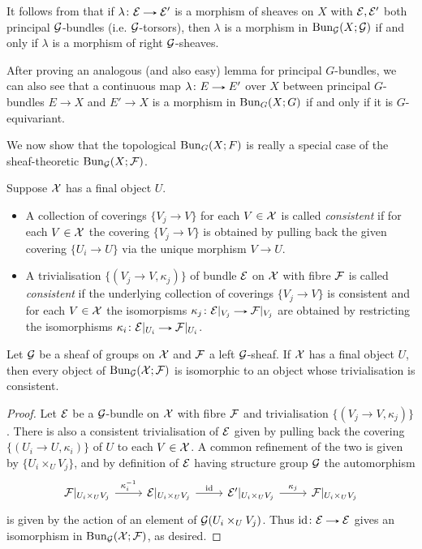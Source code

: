 \begin{remark}
  It follows from  that if $\lambda \c \E \to \E'$ is
  a morphism of sheaves on $X$ with $\mathcal{E},\mathcal{E}'$ both principal
  $\mathcal{G}$-bundles (i.e. $\mathcal{G}$-torsors), then $\lambda$ is a morphism in
  $\operatorname{Bun}_{\mathcal{G}}(X;\mathcal{G})$ if and only if $\lambda$ is a morphism of right
  $\mathcal{G}$-sheaves.

  After proving an analogous (and also easy) lemma for principal
  $G$-bundles, we can also see that a continuous map $\lambda \c E \to
  E'$ over $X$ between principal $G$-bundles $E \to X$ and $E' \to X$
  is a morphism in $\operatorname{Bun}_G(X;G)$ if and only if it is $G$-equivariant.
\end{remark}

We now show that the topological $\operatorname{Bun}_G(X;F)$ is really a special
case of the sheaf-theoretic $\operatorname{Bun}_{\mathcal{G}}(X;\mathcal{F})$.

\begin{definition}
  Suppose $\mathcal{X}$ has a final object $U$.
  \begin{itemize}
  \item A collection of coverings $\{V_j \to V\}$ for each $V \in \mathcal{X}$
    is called \emph{consistent} if for each $V \in \mathcal{X}$ the covering
    $\{V_j \to V\}$ is obtained by pulling back the given covering
    $\{U_i \to U\}$ via the unique morphism $V \to U$.
  \item A trivialisation $\{(V_j \to V,\kappa_j)\}$ of bundle $\mathcal{E}$ on
    $\mathcal{X}$ with fibre $\mathcal{F}$ is called \emph{consistent} if the underlying
    collection of coverings $\{V_j \to V\}$ is consistent and for each
    $V \in \mathcal{X}$ the isomorpisms $\kappa_j \c \E|_{V_j} \to \F|_{V_j}$
    are obtained by restricting the isomorphisms $\kappa_i \c
    \E|_{U_i} \to \F|_{U_i}$.
  \end{itemize}

\end{definition}

\begin{lemma}
  \label{iso-consistent}
  Let $\mathcal{G}$ be a sheaf of groups on $\mathcal{X}$ and $\mathcal{F}$ a left $\mathcal{G}$-sheaf. If
  $\mathcal{X}$ has a final object $U$, then every object of $\operatorname{Bun}_{\mathcal{G}}(\mathcal{X};\mathcal{F})$
  is isomorphic to an object whose trivialisation is consistent.
\end{lemma}

\begin{proof}
  Let $\mathcal{E}$ be a $\mathcal{G}$-bundle on $\mathcal{X}$ with fibre $\mathcal{F}$ and trivialisation
  $\{(V_j \to V,\kappa_j)\}$. There is also a consistent
  trivialisation of $\mathcal{E}$ given by pulling back the covering $\{(U_i
  \to U, \kappa_i)\}$ of $U$ to each $V \in \mathcal{X}$. A common refinement
  of the two is given by $\{U_i \times_U V_j\}$, and by definition
   of $\mathcal{E}$ having structure group $\mathcal{G}$ the
  automorphism
  \[
  \begin{tikzcd}
    \F|_{U_i \times_U V_j} \ar{r}{\kappa_i^{-1}} &
    \E|_{U_i \times_U V_j} \ar{r}{\id} &
    \E'|_{U_i \times_U V_j} \ar{r}{\kappa_{j}} &
    \F|_{U_i \times_U V_j}
  \end{tikzcd}
  \]
  is given by the action of an element of $\mathcal{G}(U_i \times_U V_j)$. Thus
  $\id \c \E \to \E$ gives an isomorphism in $\operatorname{Bun}_{\mathcal{G}}(\mathcal{X};\mathcal{F})$, as
  desired.
\end{proof}

